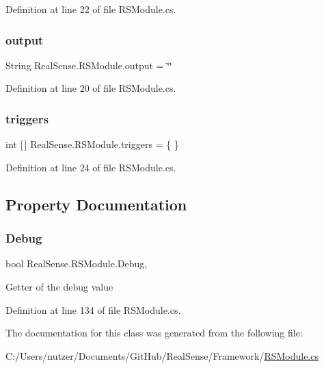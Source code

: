 Definition at line 22 of file R\+S\+Module.\+cs.

\mbox{\label{class_real_sense_1_1_r_s_module_a5f0ea0ffd2361fd2b792ed808a67f911}} 
\subsubsection{\texorpdfstring{output}{output}}
{\footnotesize\ttfamily String Real\+Sense.\+R\+S\+Module.\+output = \char`\"{}\char`\"{}}



Definition at line 20 of file R\+S\+Module.\+cs.

\mbox{\label{class_real_sense_1_1_r_s_module_a100988a1b957067db074dad8b4b9a078}} 
\subsubsection{\texorpdfstring{triggers}{triggers}}
{\footnotesize\ttfamily int \mbox{[}$\,$\mbox{]} Real\+Sense.\+R\+S\+Module.\+triggers = \{ \}}



Definition at line 24 of file R\+S\+Module.\+cs.



\subsection{Property Documentation}
\mbox{\label{class_real_sense_1_1_r_s_module_a89c9c568ab387b183a63ed2755a82203}} 
\subsubsection{\texorpdfstring{Debug}{Debug}}
{\footnotesize\ttfamily bool Real\+Sense.\+R\+S\+Module.\+Debug\hspace{0.3cm}{\ttfamily [get]}, {\ttfamily [set]}}

Getter of the debug value 

Definition at line 134 of file R\+S\+Module.\+cs.



The documentation for this class was generated from the following file\+:\begin{DoxyCompactItemize}
\item 
C\+:/\+Users/nutzer/\+Documents/\+Git\+Hub/\+Real\+Sense/\+Framework/\hyperlink{_r_s_module_8cs}{R\+S\+Module.\+cs}\end{DoxyCompactItemize}
